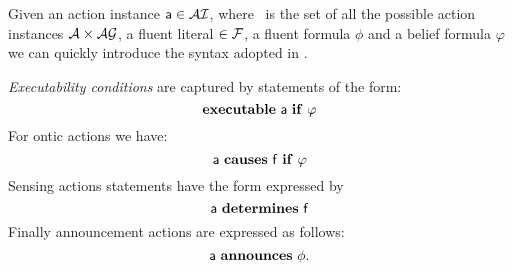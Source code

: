 Given an action instance $\mathsf{a} \in \mathcal{A}\mathcal{I}$, where \ai\ is the set of all the possible action instances $\mathcal{A} \times \mathcal{AG}$, a fluent literal  $\in \mathcal{F}$, a fluent formula $\phi$ and a belief formula $\varphi$ we can quickly introduce the syntax adopted in \mAL.


\emph{Executability conditions} are captured by statements of the form:
\begin{equation*}
\label{eq:exec_cond}
\mathbf{executable\ }\mathsf{a} \mathbf{\ if\ } \varphi 
\end{equation*}
%
For ontic actions we have:
\begin{equation*}
\label{eq:causes}
\mathsf{a} \mathbf{\ causes\ } \mathsf{f\ }  \mathbf{if}\ \varphi
\end{equation*}
%
Sensing actions statements have the form expressed by
\begin{equation*}
\label{eq:determines}
\mathsf{a} \mathbf{\ determines\ } \mathsf{f} 
\end{equation*}
Finally announcement actions are expressed as follows:
\begin{equation*}
\label{eq:announces}
\mathsf{a} \mathbf{\ announces\ } \mathsf{\phi} .
\end{equation*}
%


